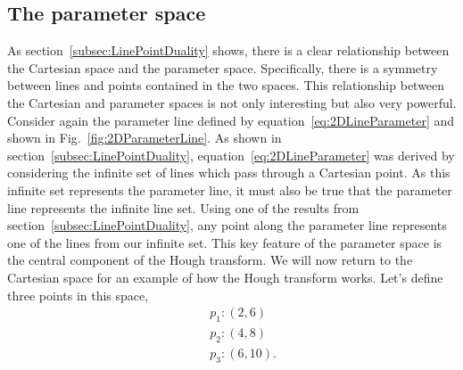 \subsection{The parameter space}
\label{subsec:ParameterSpace}
As section~\ref{subsec:LinePointDuality} shows, there is a clear relationship between the Cartesian space and the parameter space.  Specifically, there is a symmetry between lines and points contained in the two spaces.  This relationship between the Cartesian and parameter spaces is not only interesting but also very powerful.  Consider again the parameter line defined by equation~\ref{eq:2DLineParameter} and shown in Fig.~\ref{fig:2DParameterLine}.  As shown in section~\ref{subsec:LinePointDuality}, equation~\ref{eq:2DLineParameter} was derived by considering the infinite set of lines which pass through a Cartesian point.  As this infinite set represents the parameter line, it must also be true that the parameter line represents the infinite line set.  Using one of the results from section~\ref{subsec:LinePointDuality}, any point along the parameter line represents one of the lines from our infinite set.  This key feature of the parameter space is the central component of the Hough transform.  
\newline
\newline
We will now return to the Cartesian space for an example of how the Hough transform works.  Let's define three points in this space,
\begin{equation}
  \begin{split}
    &\quad p_{1}: (2,6) \\
    &\quad p_{2}: (4,8) \\
    &\quad p_{3}: (6,10).
  \end{split}
  \label{eq:HTExampleCartesianPoints}
\end{equation}
